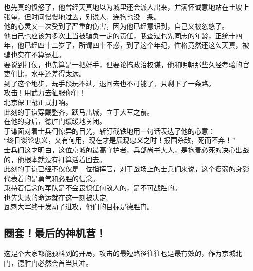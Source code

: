 \begin{multicols}{\theparacolNo}
也先真的愤怒了，他曾经天真地以为城里还会派人出来，并满怀诚意地站在土坡上张望，但时间慢慢地过去，别说人，连狗也没一条。\\

他的心灵又一次受到了严重的伤害，因为他已经意识到，自己又被忽悠了。\\

他自己也应该为多次上当被骗负一定的责任，我查过也先同志的年龄，正统十四年，他已经四十二岁了，所谓四十不惑，到了这个年纪，性格竟然还这么天真，被骗也实在不算冤枉。\\

要说到打仗，也先算是一把好手，但要论搞政治权谋，他和明朝那些久经考验的官吏们比，水平还差得太远。\\

到了这个地步，玩手段玩不过，退回去也不可能了，只剩下了一条路。\\

攻击！用武力去征服你们！\\

北京保卫战正式打响。\\

此刻的于谦穿戴整齐，跃马出城，立于大军之前。\\

在他的身后，德胜门缓缓地关闭。\\

于谦面对着士兵们惊异的目光，斩钉截铁地用一句话表达了他的心意：\\

“终日谈论忠义，又有何用，现在才是展现忠义之时！报国杀敌，死而不弃！”\\

士兵们这才明白，这位京城的最高守护者，兵部尚书大人，是抱着必死的决心出战的，他根本就没有打算活着回去。\\

此刻的于谦已经不仅仅是一位指挥官，对于战场上的士兵们来说，这个瘦弱的身影代表着的是勇气和必胜的信念。\\

秉持着信念的军队是不会畏惧任何敌人的，是不可战胜的。\\

也先失败的命运就在这一刻被决定。\\

瓦剌大军终于发动了进攻，他们的目标是德胜门。\\

\subsection{圈套！最后的神机营！}
这是个大家都能预料到的开局，攻击的最短路径往往也是最有效的，作为京城北门，德胜门必然会首当其冲。\\


\end{multicols}
